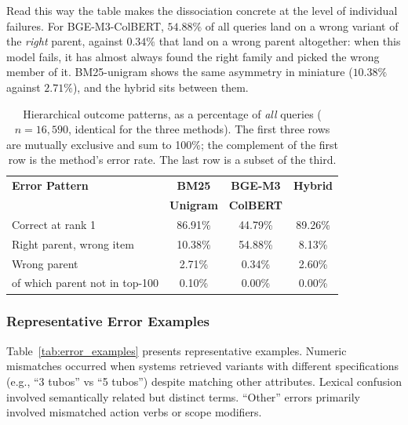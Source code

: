 \documentclass[preprint,review,12pt]{elsarticle}
\begin{document}
Read this way the table makes the dissociation concrete at the level of individual failures. For BGE-M3-ColBERT, $54.88\%$ of all queries land on a wrong variant of the \emph{right} parent, against $0.34\%$ that land on a wrong parent altogether: when this model fails, it has almost always found the right family and picked the wrong member of it. BM25-unigram shows the same asymmetry in miniature ($10.38\%$ against $2.71\%$), and the hybrid sits between them.

\begin{table}[htbp]
\centering
\caption{Hierarchical outcome patterns, as a percentage of \emph{all} queries ($n=16{,}590$, identical for the three methods). The first three rows are mutually exclusive and sum to 100\%; the complement of the first row is the method's error rate. The last row is a subset of the third.}
\label{tab:hierarchical_errors}
\begin{tabular}{lccc}
\toprule
\textbf{Error Pattern} & \textbf{BM25} & \textbf{BGE-M3} & \textbf{Hybrid} \\
 & \textbf{Unigram} & \textbf{ColBERT} & \\
\midrule
Correct at rank 1        & 86.91\% & 44.79\% & 89.26\% \\
\midrule
Right parent, wrong item & 10.38\% & 54.88\% & 8.13\%  \\
Wrong parent             & 2.71\%  & 0.34\%  & 2.60\%  \\
\quad of which parent not in top-100 & 0.10\%  & 0.00\%  & 0.00\%  \\
\bottomrule
\end{tabular}
\end{table}

\subsubsection{Representative Error Examples}

Table~\ref{tab:error_examples} presents representative examples. Numeric mismatches occurred when systems retrieved variants with different specifications (e.g., ``3 tubos'' vs ``5 tubos'') despite matching other attributes. Lexical confusion involved semantically related but distinct terms. ``Other'' errors primarily involved mismatched action verbs or scope modifiers.
\end{document}
